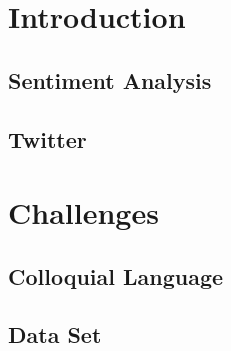 \documentclass[10pt]{article}
\begin{document}



\tableofcontents
\newpage

\abstract{
} \newpage

\section{Introduction}

\subsection{Sentiment Analysis}

\subsection{Twitter}


\section{Challenges}

\subsection{Colloquial Language}

\subsection{Data Set}


\end{document}
